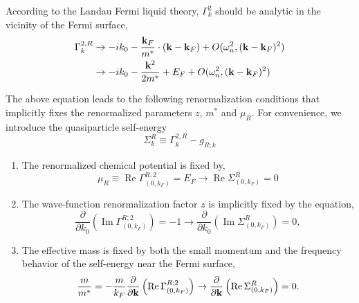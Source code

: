 \documentclass[reprint,amsmath,amssymb,aps,prb]{revtex4-1}
\begin{document}
According to the Landau Fermi liquid theory, $\Gamma^2_k$ should be analytic in the vicinity of the Fermi surface,
\begin{align*}
    \Gamma^{2,R}_k & \rightarrow -i k_0-\frac{\bold{k}_F}{m^*}\cdot(\bold{k}-\bold{k}_F)+O(\omega_n^2, (\bold{k}-\bold{k}_F)^2) \\
                   & \rightarrow -i k_0-\frac{\bold{k}^2}{2m^*}+E_F+O(\omega_n^2, (\bold{k}-\bold{k}_F)^2)
\end{align*}

The above equation leads to the following renormalization conditions that implicitly fixes the renormalized parameters $z$, $m^*$ and $\mu_R$.
For convenience, we introduce the quasiparticle self-energy
\begin{equation}
    \Sigma^{R}_k \equiv \Gamma^{2,R}_k-g_{R; k}
\end{equation}

\begin{enumerate}
    \item The renormalized chemical potential is fixed by,
          \begin{equation}
              \label{eq:condition1}
              \mu_R \equiv \operatorname{Re}\Gamma^{R;2}_{(0, k_F)} = E_F \rightarrow \operatorname{Re}\Sigma^{R}_{(0, k_F)} = 0
          \end{equation}

    \item The wave-function renormalization factor $z$ is implicitly fixed by the equation,
          \begin{equation}
              \label{eq:condition2}
              \frac{\partial }{\partial k_0}\left(\operatorname{Im} \Gamma^{R; 2}_{(0, k_F)}\right) = -1 \rightarrow \frac{\partial }{\partial k_0}\left(\operatorname{Im} \Sigma^{R}_{(0, k_F)}\right) = 0,
          \end{equation}
    \item The effective mass is fixed by both the small momentum and the frequency behavior of the self-energy near the Fermi surface,
          \begin{equation}
              \label{eq:condition3}
              \frac{m}{m^*}=-\frac{m}{k_F}\frac{\partial }{\partial \bold{k}}\left(\operatorname{Re}\Gamma^{R;2}_{(0, k_F)}\right) \rightarrow \frac{\partial }{\partial \bold{k}}\left(\operatorname{Re}\Sigma^{R}_{(0, k_F)}\right)=0.
          \end{equation}
\end{enumerate}
\end{document}
